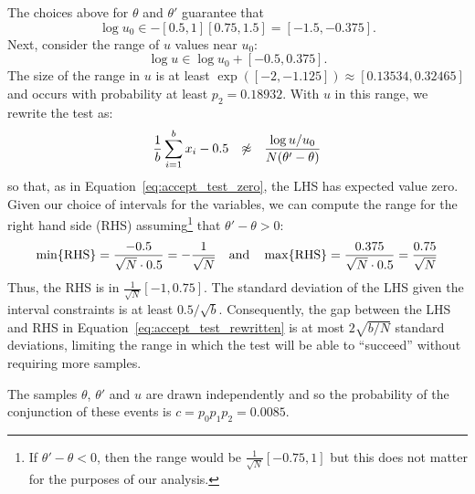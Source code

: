 \documentclass{article}
\begin{document}
The choices above for $\theta$ and $\theta'$ guarantee that
\begin{equation}\label{eq:log_uo_range}
    \log u_0 \in -[0.5,1][0.75,1.5] = [-1.5, -0.375].
\end{equation}
Next, consider the range of $u$ values near $u_0$:
\begin{equation}\label{eq:log_u_range}
    \log u \in \log u_0 + [-0.5,0.375].
\end{equation}
The size of the range in $u$ is at least $\exp([-2,-1.125]) \approx
[0.13534,0.32465]$ and occurs with probability at least $p_2=0.18932$. With $u$
in this range, we rewrite the test as:
\begin{equation}\label{eq:accept_test_rewritten}
    \frac{1}{b}\sum_{i=1}^b x_i-0.5 \hspace{0.1in} \not\approx \hspace{0.1in} \frac{\log u/u_0}{N(\theta'-\theta)}
\end{equation}
so that, as in Equation~\ref{eq:accept_test_zero}, the LHS has expected value
zero.  Given our choice of intervals for the variables, we can compute the range
for the right hand side (RHS) assuming\footnote{If $\theta'-\theta<0$, then the
range would be $\frac{1}{\sqrt{N}}[-0.75,1]$ but this does not matter for
the purposes of our analysis.} that $\theta'-\theta > 0$:
\begin{equation}\label{eq:rhs_range}
    \min\{{\rm RHS}\} = \frac{-0.5}{\sqrt{N} \cdot 0.5} = -\frac{1}{\sqrt{N}}
    \quad {\rm and} \quad 
    \max\{{\rm RHS}\} = \frac{0.375}{\sqrt{N} \cdot 0.5} = \frac{0.75}{\sqrt{N}}
\end{equation}
Thus, the RHS is in $\frac{1}{\sqrt{N}}[-1,0.75]$.  The standard deviation of
the LHS given the interval constraints is at least $0.5/\sqrt{b}$.
Consequently, the gap between the LHS and RHS in
Equation~\ref{eq:accept_test_rewritten} is at most $2\sqrt{b/N}$ standard
deviations, limiting the range in which the test will be able to ``succeed''
without requiring more samples.

The samples $\theta$, $\theta'$ and $u$ are drawn independently and so the
probability of the conjunction of these events is $c = p_0 p_1 p_2 = 0.0085$.



\end{document}

